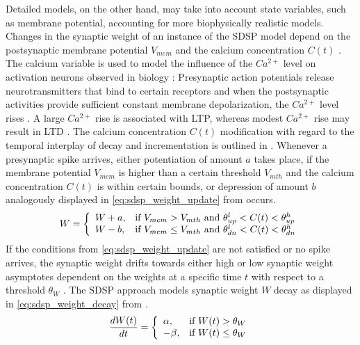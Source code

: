 Detailed models, on the other hand, may take into account state variables, such as membrane potential, 
accounting for more biophysically realistic models.
Changes in the synaptic weight of an instance of the \ac{SDSP} model depend on the postsynaptic membrane potential $V_{mem}$ and 
the calcium concentration $C(t)$ \cite{Synaptic_plasticity}.
The calcium variable is used to model the influence of the $Ca^{2+}$ level on activation neurons observed in biology \cite{STDP_hebbian}:
Presynaptic action potentials release neurotransmitters that bind to certain receptors and 
when the postsynaptic activities provide sufficient constant membrane depolarization, the $Ca^{2+}$ level rises \cite{Synaptic_plasticity}.
A large $Ca^{2+}$ rise is associated with \ac{LTP}, whereas modest $Ca^{2+}$ rise may result in \ac{LTD} \cite{STDP_hebbian}.
The calcium concentration $C(t)$  modification with regard to the temporal interplay of decay and incrementation is outlined in \cite{simulation_STDP}.
Whenever a presynaptic spike arrives, either potentiation of amount $a$ takes place, 
if the membrane potential $V_{mem}$ is higher than a certain threshold $V_{mth}$ and the 
calcium concentration $C(t)$ is within certain bounds, 
or depression of amount $b$ analogously displayed in \autoref{eq:sdsp_weight_update} from \cite{Synaptic_plasticity} occurs.
%
\begin{equation}
    \centering
    \label{eq:sdsp_weight_update} 
    W = 
    \left\{
    \begin{array}{ll}
        W + a, & \text{if } V_{mem} > V_{mth} \text{ and } \theta^l_{up} < C(t) < \theta^h_{up}\\
        W - b, & \text{if } V_{mem} \le V_{mth} \text{ and } \theta^l_{dn} < C(t) < \theta^h_{dn}
    \end{array}
    \right.
\end{equation}
%
If the conditions from \autoref{eq:sdsp_weight_update} are not satisfied or no spike arrives, 
the synaptic weight drifts towards either high or low synaptic weight asymptotes dependent on the weights at a specific time $t$ 
with respect to a threshold $\theta_W$ \cite{Synaptic_plasticity}.
The \ac{SDSP} approach models synaptic weight $W$ decay as displayed in \autoref{eq:sdsp_weight_decay} from \cite{Synaptic_plasticity}.
%
\begin{equation}
    \centering
    \label{eq:sdsp_weight_decay}
    \frac{dW(t)}{dt} = 
    \left\{
    \begin{array}{ll}
        \alpha, & \text{if } W(t) > \theta_W\\
        - \beta, & \text{if } W(t) \le \theta_W\\
    \end{array}
    \right.
\end{equation}

